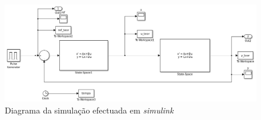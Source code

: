 \documentclass[%
  reprint,
  nofootinbib,
  amsmath,amssymb,
  aps,
  10pt,
  a4paper
]{revtex4-1}
\begin{document}
\begin{figure}[t]
  \includegraphics[width=.6\textheight]{../img/simulink.png}%
  \caption{\label{../img/simulink.png} Diagrama da simulação efectuada em {\it simulink}}
\end{figure}




\nocite{*}
{}
\end{document}
